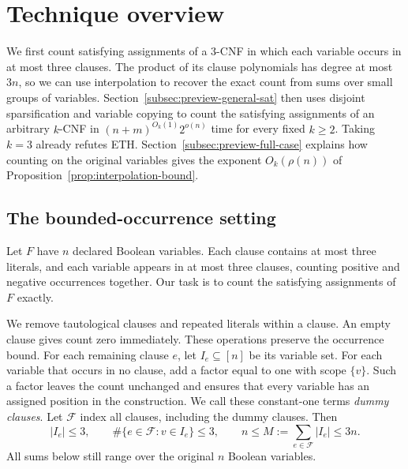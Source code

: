 \documentclass[11pt,reqno]{amsart}
\numberwithin{equation}{section}
\theoremstyle{definition}\newtheorem{definition}[theorem]{Definition}
\theoremstyle{remark}\newtheorem{remark}[theorem]{Remark}
\renewcommand{\le}{\leqslant}
\renewcommand{\ge}{\geqslant}
\begin{document}
\section{Technique overview}\label{sec:technical-overview}
We first count satisfying assignments of a $3$-CNF in which each
variable occurs in at most three clauses. The product of its clause
polynomials has degree at most $3n$, so we can use interpolation to
recover the exact count from sums over small groups of variables.
Section~\ref{subsec:preview-general-sat} then uses disjoint
sparsification and variable copying to count the satisfying assignments
of an arbitrary $k$-CNF in $(n+m)^{O_k(1)}2^{o(n)}$ time for every
fixed $k\ge2$. Taking $k=3$ already refutes ETH.
Section~\ref{subsec:preview-full-case} explains how counting on the
original variables gives the exponent $O_k(\rho(n))$ of
Proposition~\ref{prop:interpolation-bound}.

\subsection{The bounded-occurrence setting}\label{subsec:preview-setting}
Let $F$ have $n$ declared Boolean variables. Each clause contains
at most three literals, and each variable appears in at most
three clauses, counting positive and negative occurrences together.
Our task is to count the satisfying assignments of $F$ exactly.

We remove tautological clauses and repeated literals within a
clause. An empty clause gives count zero immediately.
These operations preserve the occurrence bound. For each remaining
clause $e$, let $I_e\subseteq[n]$ be its variable set.
For each variable that occurs in no clause, add a factor equal to
one with scope $\{v\}$. Such a factor leaves the count unchanged
and ensures that every variable has an assigned position in the
construction. We call these constant-one terms \emph{dummy clauses}.
Let $\mathcal F$ index all clauses, including the dummy clauses. Then
\begin{equation}\label{eq:overview-incidences}
 |I_e|\le3,\qquad
 \#\{e\in\mathcal F:v\in I_e\}\le3,\qquad
 n\le M:=\sum_{e\in\mathcal F}|I_e|\le3n.
\end{equation}
All sums below still range over the original $n$ Boolean variables.
\end{document}
